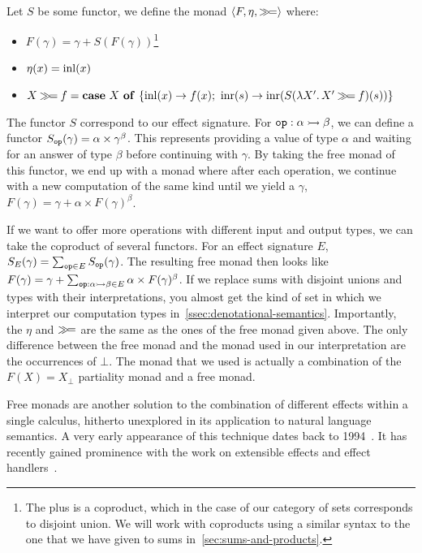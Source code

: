 Let $S$ be some functor, we define the monad
$\left<F, \eta, \mathbin{\gg\!=}\right>$ where:

\begin{itemize}
\item $F(\gamma) = \gamma + S(F(\gamma))$\footnote{The plus is a coproduct,
    which in the case of our category of sets corresponds to disjoint
    union. We will work with coproducts using a similar syntax to the one
    that we have given to sums in~\ref{sec:sums-and-products}.}
\item $\eta(x) = \operatorname{inl}(x)$
\item $X \mathbin{\gg\!=} f = \text{\textbf{case} $X$ \textbf{of} $\{ \operatorname{inl}(x) \to f(x);\ \operatorname{inr}(s) \to \operatorname{inr}(S(\lambda X'.\, X' \mathbin{\gg\!=} f)(s)) \}$}$
\end{itemize}

The functor $S$ correspond to our effect signature. For
$\mathtt{op} : \alpha \rightarrowtail \beta$, we can define a functor
$S_{\mathtt{op}}(\gamma) = \alpha \times \gamma^\beta$. This represents
providing a value of type $\alpha$ and waiting for an answer of type
$\beta$ before continuing with $\gamma$. By taking the free monad of this
functor, we end up with a monad where after each operation, we continue
with a new computation of the same kind until we yield a $\gamma$,
$F(\gamma) = \gamma + \alpha \times F(\gamma)^\beta$.

If we want to offer more operations with different input and output types,
we can take the coproduct of several functors. For an effect signature $E$,
$S_E(\gamma) = \sum_{\mathtt{op} \in E} S_{\mathtt{op}}(\gamma)$.  The resulting
free monad then looks like
$F(\gamma) = \gamma + \sum_{\mathtt{op} : \alpha \rightarrowtail \beta \in E} \alpha
\times F(\gamma)^\beta$. If we replace sums with disjoint unions and types
with their interpretations, you almost get the kind of set in which we
interpret our computation types
in~\ref{ssec:denotational-semantics}. Importantly, the $\eta$ and $\mathbin{\gg\!=}$
are the same as the ones of the free monad given above. The only difference
between the free monad and the monad used in our interpretation are the
occurrences of $\bot$. The monad that we used is actually a combination of
the $F(X) = X_\bot$ partiality monad and a free monad.

Free monads are another solution to the combination of different effects
within a single calculus, hitherto unexplored in its application to natural
language semantics. A very early appearance of this technique dates back to
1994~\cite{cartwright1994extensible}. It has recently gained prominence
with the work on extensible effects and effect
handlers~\cite{kiselyov2013extensible,bauer2012programming,kammar2013handlers,brady2013programming,plotkin2013handling,pretnar2010logic}.


